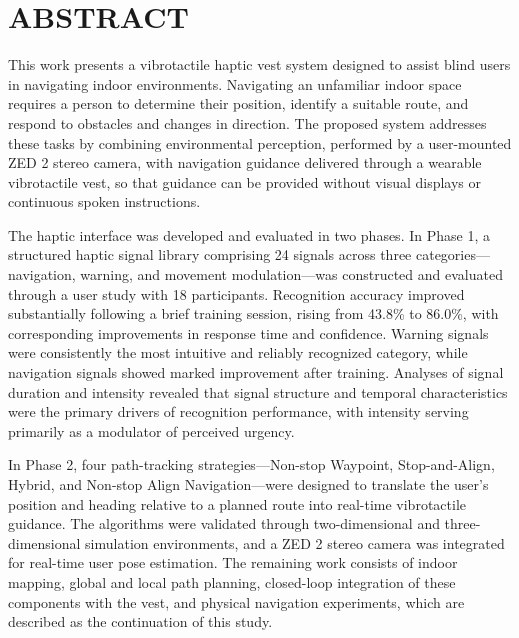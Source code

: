 \documentclass[12pt]{report}
\newcommand{\chapterx}[1]{%
  \chapter*{#1}%
  \addcontentsline{toc}{chapter}{#1}%
}
\begin{document}
\clearpage

\chapterx{ABSTRACT}
\thispagestyle{fancy}

\noindent This work presents a vibrotactile haptic vest system designed to assist blind users in navigating indoor environments. Navigating an unfamiliar indoor space requires a person to determine their position, identify a suitable route, and respond to obstacles and changes in direction. The proposed system addresses these tasks by combining environmental perception, performed by a user-mounted ZED 2 stereo camera, with navigation guidance delivered through a wearable vibrotactile vest, so that guidance can be provided without visual displays or continuous spoken instructions.

The haptic interface was developed and evaluated in two phases. In Phase 1, a structured haptic signal library comprising 24 signals across three categories---navigation, warning, and movement modulation---was constructed and evaluated through a user study with 18 participants. Recognition accuracy improved substantially following a brief training session, rising from 43.8\% to 86.0\%, with corresponding improvements in response time and confidence. Warning signals were consistently the most intuitive and reliably recognized category, while navigation signals showed marked improvement after training. Analyses of signal duration and intensity revealed that signal structure and temporal characteristics were the primary drivers of recognition performance, with intensity serving primarily as a modulator of perceived urgency.

In Phase 2, four path-tracking strategies---Non-stop Waypoint, Stop-and-Align, Hybrid, and Non-stop Align Navigation---were designed to translate the user's position and heading relative to a planned route into real-time vibrotactile guidance. The algorithms were validated through two-dimensional and three-dimensional simulation environments, and a ZED 2 stereo camera was integrated for real-time user pose estimation. The remaining work consists of indoor mapping, global and local path planning, closed-loop integration of these components with the vest, and physical navigation experiments, which are described as the continuation of this study.


\clearpage

\tableofcontents
\clearpage

\listoffigures
{}
\clearpage
\end{document}

